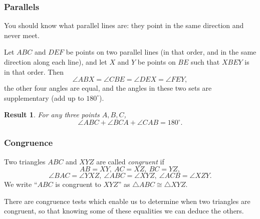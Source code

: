 \documentclass{amsart}
\newtheorem{result}{Result}[subsubsection]
\begin{document}
\subsubsection{Parallels}
You should know what parallel lines are: they point in the same direction and
never meet.

Let $ABC$ and $DEF$ be points on two parallel lines (in that order, and in the
same direction along each line), and let
$X$ and $Y$ be points on $BE$ such that $XBEY$ is in that order.
Then
\[\angle ABX=\angle CBE=\angle DEX=\angle FEY,\] the other four angles are
equal, and the angles in these two sets are supplementary (add up to 
$180^\circ$).
\begin{result}{\label{r:b:g:p:1}}
  For any three points $A, B, C$, \[\angle ABC+\angle
  BCA+\angle CAB=180^\circ.\]
\end{result}
\subsubsection{Congruence}
Two triangles $ABC$ and $XYZ$ are called \emph{congruent} if \[AB=XY,\ AC=XZ,\
BC=YZ,\]
\[\angle BAC=\angle YXZ,\ \angle ABC=\angle XYZ,\ \angle ACB=\angle
XZY.\]
We write ``$ABC$ is congruent to $XYZ$'' as $\triangle ABC\cong\triangle XYZ$.

There are congruence tests which enable us to determine when two triangles are
congruent, so that knowing some of these equalities we can deduce the others.
\end{document}
